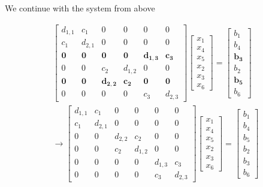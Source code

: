 \documentclass{article}
\begin{document}
\pagebreak

\noindent We continue with the system from above

\begin{align*}
    \begin{bmatrix}
        d_{1,1}  & c_{1} & 0 & 0 & 0 & 0 \\
        c_{1} & d_{2,1} & 0 & 0 & 0  & 0 \\
        \mathbf{0} & \mathbf{0} & \mathbf{0}& \mathbf{0} & \mathbf{d_{1,3}} & \mathbf{c_{3}} \\
        0 &0 & c_{2}& d_{1,2} & 0 & 0 \\
        \mathbf{0} & \mathbf{0} & \mathbf{d_{2,2}} & \mathbf{c_{2}} & \mathbf{0}  & \mathbf{0} \\
        0& 0 &0 & 0 & c_{3} & d_{2,3}
    \end{bmatrix}\begin{bmatrix}
        x_{1} \\ x_{4} \\ x_{5} \\ x_{2} \\ x_{3}\\ x_{6}
    \end{bmatrix} = \begin{bmatrix}
        b_{1} \\ b_{4} \\ \mathbf{b_{3}} \\ b_{2}\\ \mathbf{b_{5}} \\ b_{6}
    \end{bmatrix} \\
    \longrightarrow 
    \begin{bmatrix}
        d_{1,1}  & c_{1} & 0 & 0 & 0 & 0 \\
        c_{1} & d_{2,1} & 0 & 0 & 0  & 0 \\
        0 & 0 & d_{2,2}& c_{2} & 0& 0 \\
        0 &0 & c_{2}& d_{1,2} & 0 & 0 \\
        0 & 0& 0 & 0 & d_{1,3}  & c_{3} \\
        0& 0 &0 & 0 & c_{3} & d_{2,3}
    \end{bmatrix}\begin{bmatrix}
        x_{1} \\ x_{4} \\ x_{5} \\ x_{2} \\ x_{3}\\ x_{6}
    \end{bmatrix} = \begin{bmatrix}
        b_{1} \\ b_{4} \\ b_{5} \\ b_{2}\\ b_{3} \\ b_{6}
    \end{bmatrix}
\end{align*}
\end{document}
